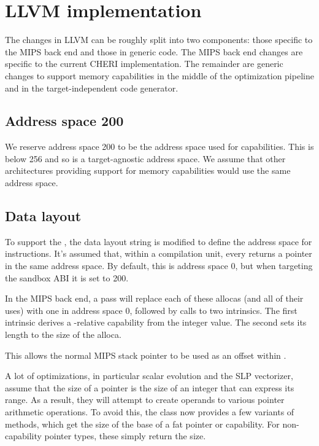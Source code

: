 \chapter{LLVM implementation}

The changes in LLVM can be roughly split into two components: those specific to the MIPS back end and those in generic code.
The MIPS back end changes are specific to the current CHERI implementation.
The remainder are generic changes to support memory capabilities in the middle of the optimization pipeline and in the target-independent code generator.

\section{Address space 200}

We reserve address space 200 to be the address space used for capabilities.
This is below 256 and so is a target-agnostic address space.
We assume that other architectures providing support for memory capabilities would use the same address space.

\section{Data layout}
\label{sec:datalayout}

To support the \sandboxABI{}, the data layout string is modified to define the address space for  instructions.
It's assumed that, within a compilation unit, every  returns a pointer in the same address space.
By default, this is address space 0, but when targeting the sandbox ABI it is set to 200.

In the MIPS back end, a pass will replace each of these allocas (and all of their uses) with one in address space 0, followed by calls to two intrinsics.
The first intrinsic derives a -relative capability from the integer value.
The second sets its length to the size of the alloca.

This allows the normal MIPS stack pointer to be used as an offset within .

A lot of optimizations, in particular scalar evolution and the SLP vectorizer, assume that the size of a pointer is the size of an integer that can express its range.
As a result, they will attempt to create  operands to various pointer arithmetic operations.
To avoid this, the  class now provides a few variants of  methods, which get the size of the base of a fat pointer or capability.
For non-capability pointer types, these simply return the size.

